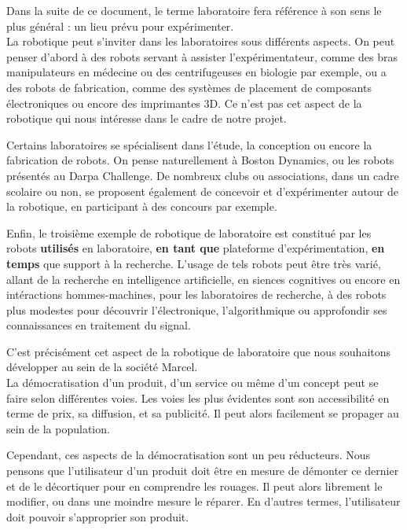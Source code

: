 \documentclass[a4paper,12pt]{report}
\begin{document}
Dans la suite de ce document, le terme laboratoire fera référence à son sens le plus général : un lieu prévu pour expérimenter.\\

La robotique peut s'inviter dans les laboratoires sous différents aspects.
On peut penser d'abord à des robots servant à assister l'expérimentateur, comme des bras manipulateurs en médecine ou des centrifugeuses en biologie par exemple, 
ou a des robots de fabrication, comme des systèmes de placement de composants électroniques ou encore des imprimantes 3D.
Ce n'est pas cet aspect de la robotique qui nous intéresse dans le cadre de notre projet.

Certains laboratoires se spécialisent dans l'étude, la conception ou encore la fabrication de robots.
On pense naturellement à Boston Dynamics, ou les robots présentés au Darpa Challenge. 
De nombreux clubs ou associations, dans un cadre scolaire ou non, se proposent également de concevoir et d'expérimenter autour de la robotique, 
en participant à des concours par exemple.

Enfin, le troisième exemple de robotique de laboratoire est constitué par les robots \textbf{utilisés} en laboratoire, 
\textbf{en tant que} plateforme d'expérimentation, \textbf{en temps} que support à la recherche.
L'usage de tels robots peut être très varié, allant de la recherche en intelligence artificielle, 
en siences cognitives ou encore en intéractions hommes-machines, pour les laboratoires de recherche, 
à des robots plus modestes pour découvrir l'électronique, l'algorithmique ou approfondir ses connaissances en traitement du signal.

C'est précisément cet aspect de la robotique de laboratoire que nous souhaitons développer au sein de la société Marcel.\\

La démocratisation d'un produit, d'un service ou même d'un concept peut se faire selon différentes voies. 
Les voies les plus évidentes sont son accessibilité en terme de prix, sa diffusion, et sa publicité.
Il peut alors facilement se propager au sein de la population.

Cependant, ces aspects de la démocratisation sont un peu réducteurs.
Nous pensons que l'utilisateur d'un produit doit être en mesure de démonter ce dernier et de le décortiquer pour en comprendre les rouages.
Il peut alors librement le modifier, ou dans une moindre mesure le réparer.
En d'autres termes, l'utilisateur doit pouvoir s'approprier son produit.
\end{document}

